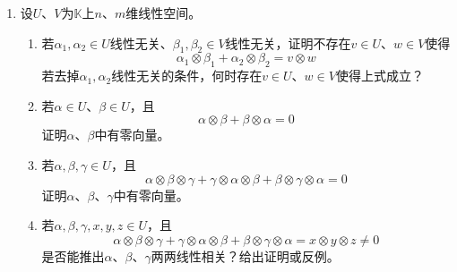 \documentclass[a4paper,UTF8,fontset=windows,AutoFakeBold]{ctexart}
\begin{document}
\begin{enumerate}
    \item
    设$U$、$V$为$\mathbb{K}$上$n$、$m$维线性空间。
    \begin{enumerate}
        \item 若$\alpha_1,\alpha_2\in U$线性无关、$\beta_1,\beta_2\in V$线性无关，证明不存在$v\in U$、$w\in V$使得
        $$\alpha_1\otimes\beta_1+\alpha_2\otimes\beta_2=v\otimes w$$
        若去掉$\alpha_1,\alpha_2$线性无关的条件，何时存在$v\in U$、$w\in V$使得上式成立？
        \item 若$\alpha\in U$、$\beta\in U$，且
        $$\alpha\otimes\beta+\beta\otimes\alpha=0$$
        证明$\alpha$、$\beta$中有零向量。
        \item 若$\alpha,\beta,\gamma\in U$，且
        $$\alpha\otimes\beta\otimes\gamma+\gamma\otimes\alpha\otimes\beta+\beta\otimes\gamma\otimes\alpha=0$$
        证明$\alpha$、$\beta$、$\gamma$中有零向量。
        \item 若$\alpha,\beta,\gamma,x,y,z\in U$，且
        $$\alpha\otimes\beta\otimes\gamma+\gamma\otimes\alpha\otimes\beta+\beta\otimes\gamma\otimes\alpha=x\otimes y\otimes z\ne0$$
        是否能推出$\alpha$、$\beta$、$\gamma$两两线性相关？给出证明或反例。
    \end{enumerate}
\end{enumerate}
\end{document}
